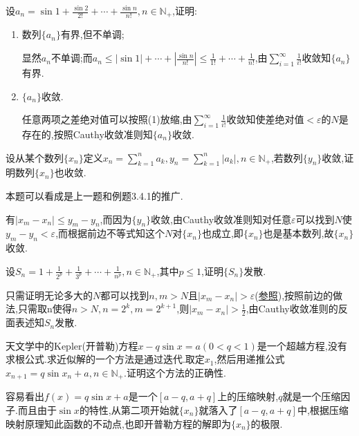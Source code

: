      \begin{exercise}
         设$a_n=\sin1+\frac{\sin2}{2!}+\cdots+\frac{\sin n}{n!},n\in \mathbb{N}_+$,证明:
         \begin{enumerate}
             \item 数列$\{a_n\}$有界,但不单调;
                   \begin{solution}
                       显然$a_n$不单调;而$a_n\leqslant\left|\sin1\right|+\cdots+\left|\frac{\sin n}{n!}\right|\leqslant\frac{1}{1!}+\cdots+\frac{1}{n!}$,由$\sum_{i=1}^\infty\frac{1}{i!}$收敛知$\{a_n\}$有界.
                   \end{solution}
             \item $\{a_n\}$收敛.
                   \begin{solution}
                       任意两项之差绝对值可以按照(1)放缩,由$\sum_{i=1}^\infty\frac{1}{i!}$收敛知使差绝对值$<\varepsilon$的$N$是存在的,按照Cauthy收敛准则知$\{a_n\}$收敛.
                   \end{solution}
         \end{enumerate}
     \end{exercise}

     \begin{exercise}
         设从某个数列$\{x_n\}$定义$x_n=\sum_{k=1}^na_k,y_n=\sum_{k=1}^n\left|a_k\right|,n\in \mathbb{N}_+$,若数列$\{y_n\}$收敛,证明数列$\{x_n\}$也收敛.
         \begin{note}
             本题可以看成是上一题和例题3.4.1的推广.
         \end{note}
     \end{exercise}
     \begin{solution}
         有$\left|x_m-x_n\right|\leqslant y_m-y_n$,而因为$\{y_n\}$收敛,由Cauthy收敛准则知对任意$\varepsilon$可以找到$N$使$y_m-y_n<\varepsilon$,而根据前边不等式知这个$N$对$\{x_n\}$也成立,即$\{x_n\}$也是基本数列,故$\{x_n\}$收敛.
     \end{solution}

     \begin{exercise}
         设$S_n=1+\frac{1}{2^p}+\frac{1}{3^p}+\cdots+\frac{1}{n^p},n\in \mathbb{N}_+$,其中$p\leqslant 1$,证明$\{S_n\}$发散.
     \end{exercise}
     \begin{solution}
         只需证明无论多大的$N$都可以找到$n,m>N$且$\left|x_m-x_n\right|>\varepsilon$(\hyperlink{2.4.p.2}{参照}),按照前边的做法,只需取n使得$n>N,n=2^k,m=2^{k+1}$,则$\left|x_m-x_n\right|>\frac{1}{2}$,由Cauthy收敛准则的反面表述知$S_n$发散.
     \end{solution}

     \begin{exercise}
         天文学中的Kepler(开普勒)方程$x-q\sin x=a(0<q<1)$是一个超越方程,没有求根公式.求近似解的一个方法是通过迭代.取定$x_1$,然后用递推公式$x_{n+1}=q\sin x_n+a,n\in \mathbb{N}_+$.证明这个方法的正确性.
     \end{exercise}
     \begin{solution}
         容易看出$f(x)=q\sin x+a$是一个$[a-q,a+q]$上的压缩映射,$q$就是一个压缩因子.而且由于$\sin x$的特性,从第二项开始就$\{x_n\}$就落入了$[a-q,a+q]$中,根据压缩映射原理知此函数的不动点,也即开普勒方程的解即为$\{x_n\}$的极限.
     \end{solution}
